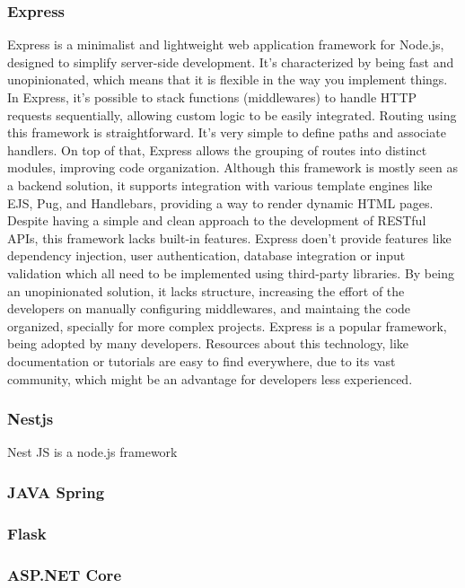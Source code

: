 \subsubsection{Express}
Express is a minimalist and lightweight web application framework for Node.js,
designed to simplify server-side development. It's characterized by being
fast and unopinionated, which means that it is flexible in the way you implement
things.
In Express, it's possible to stack functions (middlewares) to handle \gls{HTTP}
requests sequentially, allowing custom logic to be easily integrated.
Routing using this framework is straightforward. It's very simple to define
paths and associate handlers. On top of that, Express allows the grouping of
routes into distinct modules, improving code organization.
Although this framework is mostly seen as a backend solution, it supports
integration with various template engines like EJS, Pug, and Handlebars,
providing a way to render dynamic HTML pages.
Despite having a simple and clean approach to the development of RESTful APIs,
this framework lacks built-in features. Express doen't provide features like
dependency injection, user authentication, database integration or input
validation which all need to be implemented using third-party libraries.
By being an unopinionated solution, it lacks structure, increasing the effort
of the developers on manually configuring middlewares, and maintaing the code
organized, specially for more complex projects.
Express is a popular framework, being adopted by many developers. Resources
about this technology, like documentation or tutorials are easy to find
everywhere, due to its vast community, which might be an advantage for
developers less experienced.

\subsubsection{Nestjs}
Nest JS is a node.js framework\cite{nestJS}
\subsubsection{JAVA Spring}

\subsubsection{Flask}

\subsubsection{ASP.NET Core}

